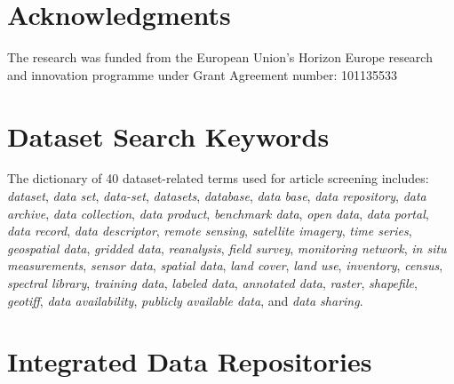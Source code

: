 \documentclass[preprint,12pt,authoryear]{elsarticle}
\begin{document}
\section{Acknowledgments}
\label{Ack}
The research was funded from the European Union’s Horizon Europe research and innovation programme under Grant Agreement number: 101135533

\appendix
\section{Dataset Search Keywords}
\label{app:keywords}
The dictionary of 40 dataset-related terms used for article screening includes: \textit{dataset}, \textit{data set}, \textit{data-set}, \textit{datasets}, \textit{database}, \textit{data base}, \textit{data repository}, \textit{data archive}, \textit{data collection}, \textit{data product}, \textit{benchmark data}, \textit{open data}, \textit{data portal}, \textit{data record}, \textit{data descriptor}, \textit{remote sensing}, \textit{satellite imagery}, \textit{time series}, \textit{geospatial data}, \textit{gridded data}, \textit{reanalysis}, \textit{field survey}, \textit{monitoring network}, \textit{in situ measurements}, \textit{sensor data}, \textit{spatial data}, \textit{land cover}, \textit{land use}, \textit{inventory}, \textit{census}, \textit{spectral library}, \textit{training data}, \textit{labeled data}, \textit{annotated data}, \textit{raster}, \textit{shapefile}, \textit{geotiff}, \textit{data availability}, \textit{publicly available data}, and \textit{data sharing}.

\appendix
\section{Integrated Data Repositories}
\label{sec:appendix_repositories}
\end{document}
